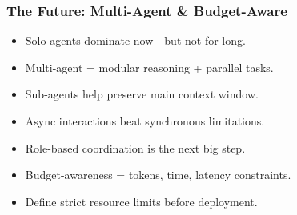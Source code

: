 \begin{frame}[fragile]\frametitle{The Future: Multi-Agent \& Budget-Aware}
    \begin{itemize}
        \item Solo agents dominate now—but not for long.
        \item Multi-agent = modular reasoning + parallel tasks.
        \item Sub-agents help preserve main context window.
        \item Async interactions beat synchronous limitations.
        \item Role-based coordination is the next big step.
        \item Budget-awareness = tokens, time, latency constraints.
        \item Define strict resource limits before deployment.
    \end{itemize}
\end{frame}

